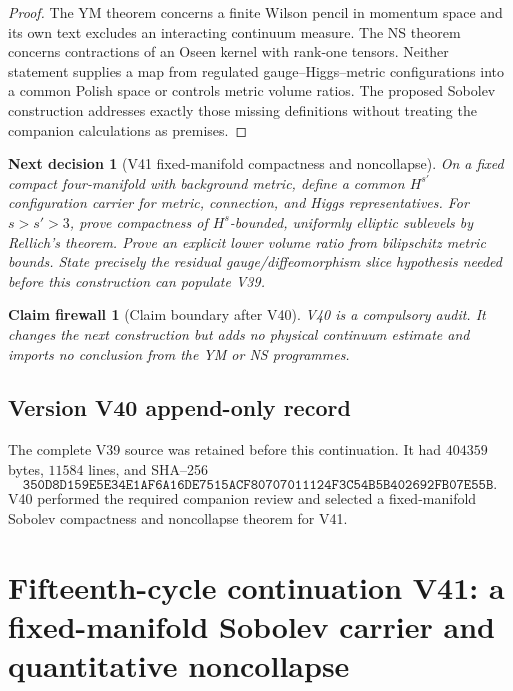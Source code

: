 \documentclass[11pt]{article}
\newtheorem{firewall}[theorem]{Claim firewall}
\newtheorem{decision}[theorem]{Next decision}
\theoremstyle{remark}
\begin{document}
\begin{proof}
The YM theorem concerns a finite Wilson pencil in momentum space and
its own text excludes an interacting continuum measure.  The NS
theorem concerns contractions of an Oseen kernel with rank-one
tensors.  Neither statement supplies a map from regulated
gauge--Higgs--metric configurations into a common Polish space or
controls metric volume ratios.  The proposed Sobolev construction
addresses exactly those missing definitions without treating the
companion calculations as premises.
\end{proof}

\begin{decision}[V41 fixed-manifold compactness and noncollapse]
\label{dec:v15v40-next}
On a fixed compact four-manifold with background metric, define a
common \(H^{s'}\) configuration carrier for metric, connection, and
Higgs representatives.  For \(s>s'>3\), prove compactness of
\(H^s\)-bounded, uniformly elliptic sublevels by Rellich's theorem.
Prove an explicit lower volume ratio from bilipschitz metric bounds.
State precisely the residual gauge/diffeomorphism slice hypothesis
needed before this construction can populate V39.
\end{decision}

\begin{firewall}[Claim boundary after V40]
\label{fire:v15v40}
V40 is a compulsory audit.  It changes the next construction but
adds no physical continuum estimate and imports no conclusion from
the YM or NS programmes.
\end{firewall}

\section*{Version V40 append-only record}
The complete V39 source was retained before this continuation.  It
had \(404359\) bytes, \(11584\) lines, and SHA--256
\[
 \texttt{350D8D159E5E34E1AF6A16DE7515ACF80707011124F3C54B5B402692FB07E55B}.
\]
V40 performed the required companion review and selected a
fixed-manifold Sobolev compactness and noncollapse theorem for V41.

\chapter{Fifteenth-cycle continuation V41: a fixed-manifold Sobolev carrier and quantitative noncollapse}
\label{sec:v15v41}
\end{document}
